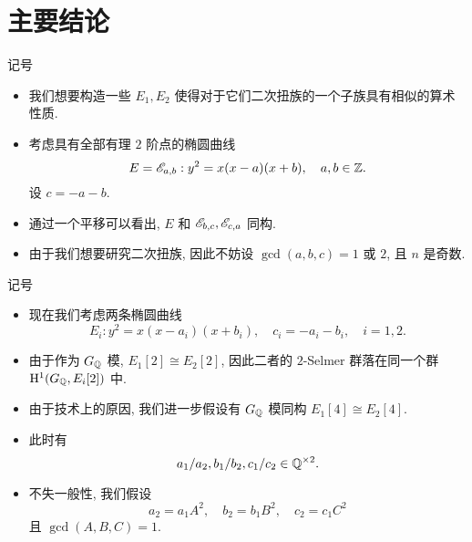 \documentclass[handout,aspectratio=1610]{ctexbeamer}
\begin{document}
\section{主要结论}
\begin{frame}{记号}
\begin{itemize}
\item 我们想要构造一些 $E_1,E_2$ 使得对于它们二次扭族的一个子族具有相似的算术性质.
\item 考虑具有全部有理 $2$ 阶点的椭圆曲线
\[E=\mathscr{E}_{a,b}:y^2=x(x-a)(x+b),\quad a,b\in{\mathbb{Z}}.\]
设 $c=-a-b$.
\item 通过一个平移可以看出, $E$ 和 $\mathscr{E}_{b,c},\mathscr{E}_{c,a}$ 同构.
\item 由于我们想要研究二次扭族, 因此不妨设 $\gcd(a,b,c)=1$ 或 $2$, 且 $n$ 是奇数.
\end{itemize}
\end{frame}

\begin{frame}[<+->]{记号}
\begin{itemize}
\item 现在我们考虑两条椭圆曲线
\[E_i:y^2=x(x-a_i)(x+b_i),\quad c_i=-a_i-b_i,\quad i=1,2.\]
\item 由于作为 $G_{\mathbb{Q}}$ 模, $E_1[2]\cong E_2[2]$, 因此二者的 $2$-Selmer 群落在同一个群 ${\mathrm{H}}^1(G_{\mathbb{Q}},E_i[2])$ 中. 
\item 由于技术上的原因, 我们进一步假设有 $G_{\mathbb{Q}}$ 模同构 $E_1[4]\cong E_2[4]$.
\item 此时有
\[a_1/a_2,b_1/b_2,c_1/c_2\in{\mathbb{Q}}^{\times2}.\]
\item 不失一般性, 我们假设
\[a_2=a_1 A^2,\quad b_2=b_1 B^2,\quad c_2=c_1 C^2 \]
且 $\gcd(A,B,C)=1$.
\end{itemize}
\end{frame}
\end{document}
